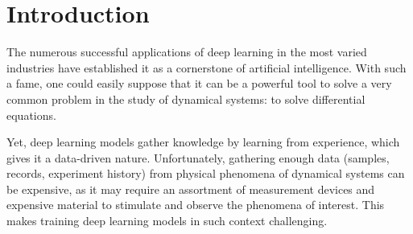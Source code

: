 \chapter{Introduction}







The numerous successful applications of deep learning in the most varied industries \cite{ciregan_multi-column_2012,krizhevsky_imagenet_2012,silver_mastering_2016} have established it as a cornerstone of artificial intelligence.
With such a fame, one could easily suppose that it can be a powerful tool to solve a very common problem in the study of dynamical systems: to solve differential equations.

Yet, deep learning models gather knowledge by learning from experience, which gives it a data-driven nature.
Unfortunately, gathering enough data (samples, records, experiment history) from physical phenomena of dynamical systems can be expensive, as it may require an assortment of measurement devices and expensive material to stimulate and observe the phenomena of interest.
This makes training deep learning models in such context challenging.

